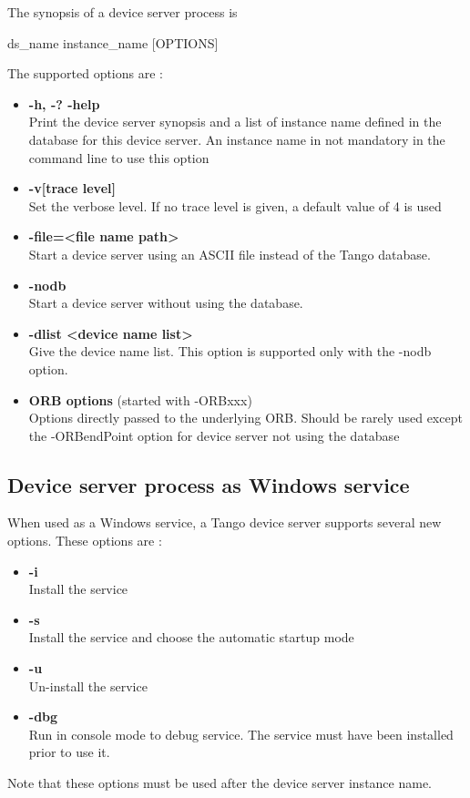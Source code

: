 The synopsis of a device server process is\begin{center}ds\_name
instance\_name {[}OPTIONS{]}\end{center}The supported options are
:
\begin{itemize}
\item \textbf{-h, -? -help}\\
Print the device server synopsis and a list of instance name defined
in the database for this device server. An instance name in not mandatory
in the command line to use this option
\item \textbf{-v{[}trace level{]}}\\
Set the verbose level. If no trace level is given, a default value
of 4 is used
\item \textbf{-file=<file name path>}\\
Start a device server using an ASCII file instead of the Tango database. 
\item \textbf{-nodb}\\
Start a device server without using the database.
\item \textbf{-dlist <device name list>}\\
Give the device name list. This option is supported only with the
-nodb option.
\item \textbf{ORB options} (started with -ORBxxx)\\
Options directly passed to the underlying ORB. Should be rarely used
except the -ORBendPoint option for device server not using the database
\end{itemize}

\subsection{Device server process as Windows service}

When used as a Windows service, a Tango device server
supports several new options. These options are :
\begin{itemize}
\item \textbf{-i}\\
Install the service
\item \textbf{-s}\\
Install the service and choose the automatic startup mode
\item \textbf{-u}\\
Un-install the service
\item \textbf{-dbg}\\
Run in console mode to debug service. The service must have been installed
prior to use it.
\end{itemize}
Note that these options must be used after the device server instance
name.

